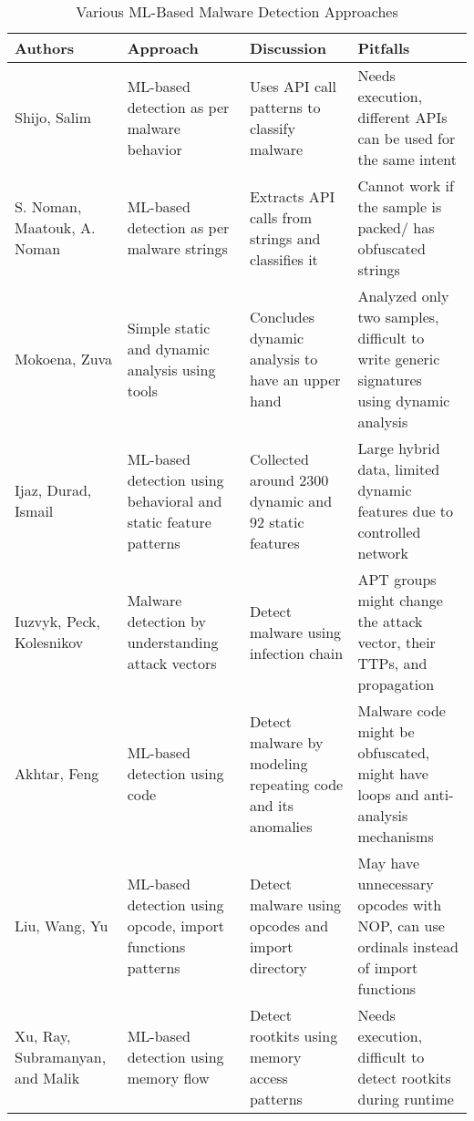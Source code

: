 \documentclass{article}
\begin{document}
\begin{table}[htbp]
    \centering
    \caption{Various ML-Based Malware Detection Approaches}
    \begin{tabular}{|p{3cm}|p{3cm}|p{3.5cm}|p{4cm}|}
        \hline
        \textbf{Authors} & \textbf{Approach} & \textbf{Discussion} & \textbf{Pitfalls} \\
        \hline
        Shijo, Salim\cite{shijo_salim} & ML-based detection as per malware behavior & Uses API call patterns to classify malware & Needs execution, different APIs can be used for the same intent \\
        \hline
        S. Noman, Maatouk, A. Noman\cite{s_noman} & ML-based detection as per malware strings & Extracts API calls from strings and classifies it & Cannot work if the sample is packed/ has obfuscated strings \\
        \hline
        Mokoena, Zuva\cite{mokoena_zuva} & Simple static and dynamic analysis using tools & Concludes dynamic analysis to have an upper hand & Analyzed only two samples, difficult to write generic signatures using dynamic analysis \\
        \hline
        Ijaz, Durad, Ismail\cite{ijaz_durad_ismail} & ML-based detection using behavioral and static feature patterns & Collected around 2300 dynamic and 92 static features & Large hybrid data, limited dynamic features due to controlled network \\
        \hline
        Iuzvyk, Peck, Kolesnikov\cite{iuzvyk_peck_kolesnikov} & Malware detection by understanding attack vectors & Detect malware using infection chain & APT groups might change the attack vector, their TTPs, and propagation \\
        \hline
        Akhtar, Feng\cite{akhtar_feng} & ML-based detection using code & Detect malware by modeling repeating code and its anomalies & Malware code might be obfuscated, might have loops and anti-analysis mechanisms \\
        \hline
        Liu, Wang, Yu\cite{liu_wang_yu} & ML-based detection using opcode, import functions patterns & Detect malware using opcodes and import directory & May have unnecessary opcodes with NOP, can use ordinals instead of import functions \\
        \hline
        Xu, Ray, Subramanyan, and Malik\cite{xu_ray_subramanyan_malik} & ML-based detection using memory flow & Detect rootkits using memory access patterns & Needs execution, difficult to detect rootkits during runtime \\

\end{tabular}
\end{table}
\end{document}
